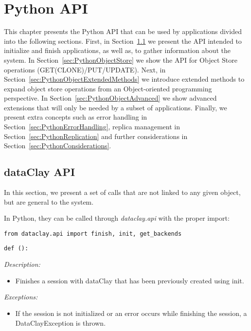 
\chapter{Python API}
\label{sec:PythonAPI}

This chapter presents the Python API that can be used by applications divided into the following sections. First, in Section~\ref{sec:PythonGlobalAPI} we present the API intended to initialize and finish applications, as well as, to gather information about the system. In Section~\ref{sec:PythonObjectStore} we show the API for Object Store operations (GET(CLONE)/PUT/UPDATE). Next, in Section~\ref{sec:PythonObjectExtendedMethods} we introduce extended methods to expand object store operations from an Object-oriented programming perspective. In Section~\ref{sec:PythonObjectAdvanced} we show advanced extensions that will only be needed by a subset of applications. Finally, we present extra concepts such as error handling in Section~\ref{sec:PythonErrorHandling}, replica management in Section~\ref{sec:PythonReplication} and further considerations in Section~\ref{sec:PythonConsiderations}.

\section{dataClay API}
\label{sec:PythonGlobalAPI}

In this section, we present a set of calls that are not linked to any given object, but are general to the system.

In Python, they can be called through \textit{dataclay.api} with the proper import:

\colorbox{basecolor!15}{\texttt{from dataclay.api import finish, init, get\_backends}}



\begin{dBox}
\texttt{def ():}
\LINE

{\it Description:}

\begin{itemize}
    \item Finishes a session with dataClay that has been previously created using init.
\end{itemize}

{\it Exceptions:}

\begin{itemize}
    \item If the session is not initialized or an error occurs while finishing the session, a DataClayException is thrown.
\end{itemize}
 
\end{dBox}


